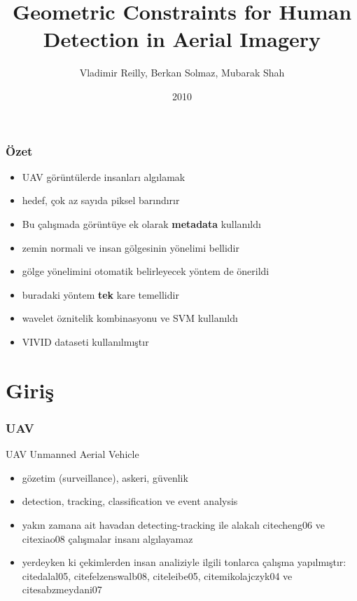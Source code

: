 \documentclass{beamer}
\title{Geometric Constraints for Human Detection in Aerial Imagery}
\author{Vladimir Reilly, Berkan Solmaz, Mubarak Shah}
\date{2010}
\institute[CVL]{Computer Vision Lab, University of Central Florida, Orlando,
USA}
\begin{document}
\frame{\titlepage}

\section[İçindekiler]{}
\frame{\tableofcontents}

\begin{frame}
	\frametitle{Özet}

	\begin{itemize}
		\item UAV görüntülerde insanları algılamak
		\item hedef, çok az sayıda piksel barındırır
		\item Bu çalışmada görüntüye ek olarak \textbf{metadata} kullanıldı
		\item zemin normali ve insan gölgesinin yönelimi bellidir
		\item gölge yönelimini otomatik belirleyecek yöntem de önerildi
		\item buradaki yöntem \textbf{tek} kare temellidir
		\item wavelet öznitelik kombinasyonu ve SVM kullanıldı
		\item VIVID dataseti kullanılmıştır
	\end{itemize}
\end{frame}

\section{Giriş}

\begin{frame}
	\frametitle{UAV}

	\begin{block}{UAV}
		Unmanned Aerial Vehicle
	\end{block}

	\begin{itemize}
		\item gözetim (surveillance), askeri, güvenlik
		\item detection, tracking, classification ve event analysis
		\item yakın zamana ait havadan detecting-tracking ile alakalı
 		      cite{cheng06} ve cite{xiao08} çalışmalar insanı algılayamaz
		\item yerdeyken ki çekimlerden insan analiziyle ilgili tonlarca çalışma
		      yapılmıştır: cite{dalal05}, cite{felzenswalb08}, cite{leibe05},
			  cite{mikolajczyk04} ve cite{sabzmeydani07}
	\end{itemize}
\end{frame}
\end{document}
